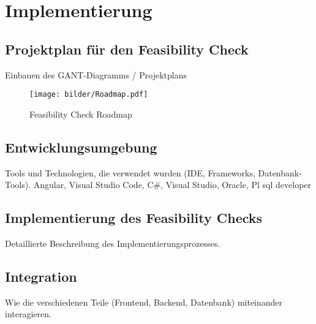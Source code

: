 \chapter{Implementierung}\label{Chap:Implementierung}

\section{Projektplan für den Feasibility Check}
Einbauen des GANT-Diagramms / Projektplans


\begin{figure}[!h]
    \centering
    \texttt{[image: bilder/Roadmap.pdf]}
    \caption{Feasibility Check Roadmap}
    \label{fig:roadmap}
\end{figure}
\section{Entwicklungsumgebung}
Tools und Technologien, die verwendet wurden (IDE, Frameworks, Datenbank-Tools).
Angular, Visual Studio Code, 
C\#, Visual Studio,
Oracle, Pl sql developer

\section{Implementierung des Feasibility Checks}
Detaillierte Beschreibung des Implementierungsprozesses.
\section{Integration}
Wie die verschiedenen Teile (Frontend, Backend, Datenbank) miteinander interagieren.